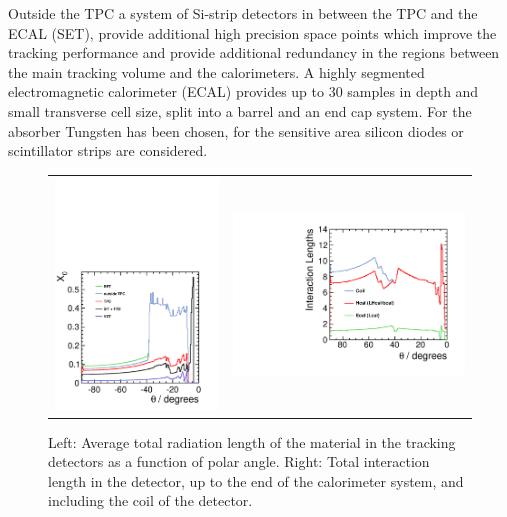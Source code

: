 Outside the TPC a system of Si-strip detectors in between the TPC and the ECAL (SET), provide additional high precision space points which improve the tracking performance and provide additional
    redundancy in the regions between the main tracking volume and the calorimeters. 
A highly segmented electromagnetic calorimeter (ECAL) provides up to 30 samples in depth and small transverse cell size, split into a barrel and an end cap system. For the absorber Tungsten has been chosen, for the sensitive area silicon diodes or scintillator strips are considered.
\begin{figure}[t!]
\begin{tabular}{cc}
\includegraphics[width=0.52\hsize,viewport={0 -10 600 500},clip]{chapters/figures/material-budget-new.pdf} &
\includegraphics[width=0.5\hsize]{chapters/figures/intlen_ILD_o1_v05.pdf}
\end{tabular}
\caption[Material in the ILD detector]{Left: Average total radiation length of the material
  in the tracking detectors as a function of polar angle. Right: Total interaction length in the detector, up to the end of the calorimeter system, and including the coil of the detector.}
\label{fig:intro:material}

\end{figure}

